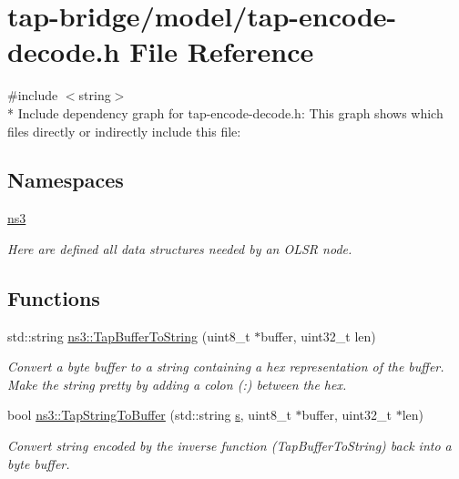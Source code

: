 \hypertarget{tap-encode-decode_8h}{}\section{tap-\/bridge/model/tap-\/encode-\/decode.h File Reference}
\label{tap-encode-decode_8h}
{\ttfamily \#include $<$string$>$}\\*
Include dependency graph for tap-\/encode-\/decode.h\+:
This graph shows which files directly or indirectly include this file\+:
\subsection*{Namespaces}
\begin{DoxyCompactItemize}
\item 
 \hyperlink{namespacens3}{ns3}
\begin{DoxyCompactList}\small\item\em Here are defined all data structures needed by an O\+L\+SR node. \end{DoxyCompactList}\end{DoxyCompactItemize}
\subsection*{Functions}
\begin{DoxyCompactItemize}
\item 
std\+::string \hyperlink{namespacens3_abf9f661689b523b4b37b97879c1ffc12}{ns3\+::\+Tap\+Buffer\+To\+String} (uint8\+\_\+t $\ast$buffer, uint32\+\_\+t len)
\begin{DoxyCompactList}\small\item\em Convert a byte buffer to a string containing a hex representation of the buffer. Make the string pretty by adding a colon (\textquotesingle{}\+:\textquotesingle{}) between the hex. \end{DoxyCompactList}\item 
bool \hyperlink{namespacens3_aac751b6756ef1eb455958b985b357b6d}{ns3\+::\+Tap\+String\+To\+Buffer} (std\+::string \hyperlink{generate__test__data__lte__sinr_8m_ad83eeb3a142285d1243a08c6b7026df8}{s}, uint8\+\_\+t $\ast$buffer, uint32\+\_\+t $\ast$len)
\begin{DoxyCompactList}\small\item\em Convert string encoded by the inverse function (Tap\+Buffer\+To\+String) back into a byte buffer. \end{DoxyCompactList}\end{DoxyCompactItemize}
